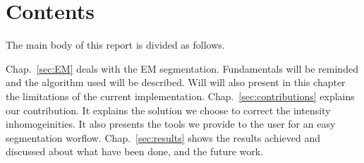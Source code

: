 \section{Contents}\label{intro:contents}
The main body of this report is divided as follows.
\par
Chap.~\ref{sec:EM} deals with the EM segmentation. Fundamentals will be reminded and the algorithm used will be described. Will will also present in this chapter the limitations of the current implementation.
Chap.~\ref{sec:contributions} explains our contribution. It explains the solution we choose to correct the intensity inhomogeinities. It also presents the tools we provide to the user for an easy segmentation worflow.
Chap.~\ref{sec:results} shows the results achieved and discussed about what have been done, and the future work.
%
